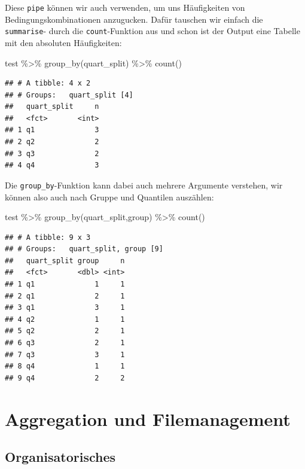 \documentclass[
]{book}
\newenvironment{Shaded}{\begin{snugshade}}{\end{snugshade}}
\newcommand{\FunctionTok}[1]{\textcolor[rgb]{0.00,0.00,0.00}{#1}}
\newcommand{\NormalTok}[1]{#1}
\newcommand{\SpecialCharTok}[1]{\textcolor[rgb]{0.00,0.00,0.00}{#1}}
\begin{document}
Diese \texttt{pipe} können wir auch verwenden, um uns Häufigkeiten von Bedingungskombinationen anzugucken. Dafür tauschen wir einfach die \texttt{summarise}- durch die \texttt{count}-Funktion aus und schon ist der Output eine Tabelle mit den absoluten Häufigkeiten:

\begin{Shaded}
\begin{Highlighting}[]
\NormalTok{test }\SpecialCharTok{\%\textgreater{}\%} 
  \FunctionTok{group\_by}\NormalTok{(quart\_split) }\SpecialCharTok{\%\textgreater{}\%} 
  \FunctionTok{count}\NormalTok{()}
\end{Highlighting}
\end{Shaded}

\begin{verbatim}
## # A tibble: 4 x 2
## # Groups:   quart_split [4]
##   quart_split     n
##   <fct>       <int>
## 1 q1              3
## 2 q2              2
## 3 q3              2
## 4 q4              3
\end{verbatim}

Die \texttt{group\_by}-Funktion kann dabei auch mehrere Argumente verstehen, wir können also auch nach Gruppe und Quantilen auszählen:

\begin{Shaded}
\begin{Highlighting}[]
\NormalTok{test }\SpecialCharTok{\%\textgreater{}\%} 
  \FunctionTok{group\_by}\NormalTok{(quart\_split,group) }\SpecialCharTok{\%\textgreater{}\%} 
  \FunctionTok{count}\NormalTok{()}
\end{Highlighting}
\end{Shaded}

\begin{verbatim}
## # A tibble: 9 x 3
## # Groups:   quart_split, group [9]
##   quart_split group     n
##   <fct>       <dbl> <int>
## 1 q1              1     1
## 2 q1              2     1
## 3 q1              3     1
## 4 q2              1     1
## 5 q2              2     1
## 6 q3              2     1
## 7 q3              3     1
## 8 q4              1     1
## 9 q4              2     2
\end{verbatim}

\hypertarget{aggregation-und-filemanagement}{%
\chapter{Aggregation und Filemanagement}\label{aggregation-und-filemanagement}}

\hypertarget{organisatorisches-4}{%
\section{Organisatorisches}\label{organisatorisches-4}}
\end{document}
